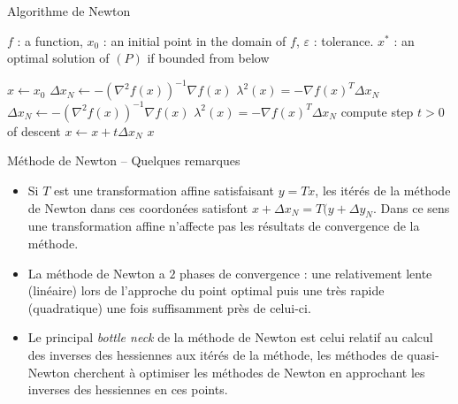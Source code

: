 \documentclass[aspectratio = 169]{beamer}
\begin{document}
\begin{frame}{Algorithme de Newton}
    \begin{algorithm}[H]
    \caption{Méthode de Newton}
    \small{
      \begin{algorithmic}[1]
        \Statex
        \Require $f$ : a function,  $x_0$ : an initial point in the domain of $f$, $\varepsilon$ : tolerance.
        \Ensure $x^*$ : an optimal solution of $(P)$ if bounded from below

        \State $x \leftarrow x_0$
        \State $\Delta x_N \leftarrow -\left(\nabla^2 f(x)\right)^{-1}\nabla f(x)$
        \State $\lambda^2(x) = -\nabla f(x)^T\Delta x_N$
        \State $\Delta x_N \leftarrow -\left(\nabla^2 f(x)\right)^{-1}\nabla f(x)$
        \State $\lambda^2(x) = -\nabla f(x)^T\Delta x_N$
        \State compute step $t > 0$ of descent
        \State $x \leftarrow x + t\Delta x_N$
        \EndWhile
        \State \Return $x$
        \EndFunction
        \Statex
      \end{algorithmic}
    }
  \end{algorithm}
\end{frame}

\begin{frame}{Méthode de Newton -- Quelques remarques}
  \begin{itemize}
  \item<1-> Si $T$ est une transformation affine satisfaisant
    $y = Tx$, les itérés de la méthode de Newton dans ces coordonées
    satisfont $x + \Delta x_N = T(y + \Delta y_N$. Dans ce sens une
    transformation affine n'affecte pas les résultats de convergence
    de la méthode.
  \item<2-> La méthode de Newton a $2$ phases de convergence : une
    relativement lente (linéaire) lors de l'approche du point optimal
    puis une très rapide (quadratique) une fois suffisamment près de
    celui-ci.
  \item<3-> Le principal \emph{bottle neck} de la méthode de Newton
    est celui relatif au calcul des inverses des hessiennes aux itérés
    de la méthode, les méthodes de quasi-Newton cherchent à optimiser
    les méthodes de Newton en approchant les inverses des hessiennes
    en ces points.
  \end{itemize}
\end{frame}
\end{document}
